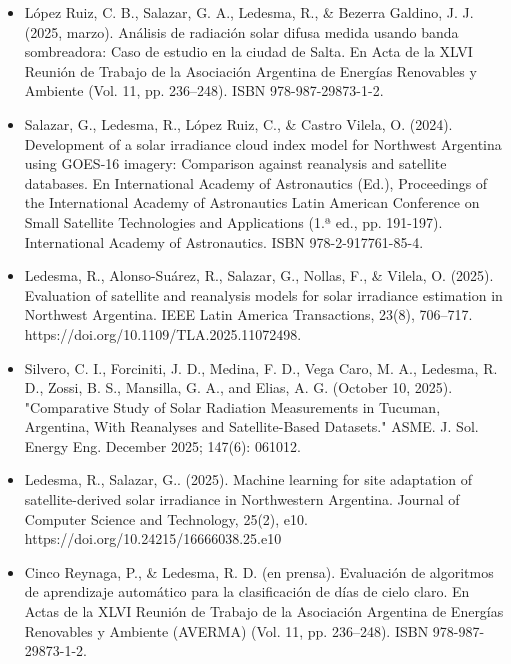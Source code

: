 \documentclass[letterpaper,12pt, twoside]{report}
\providecommand{\DIFdeltex}[1]{{\protect\color{red} \scriptsize #1}} %
\providecommand{\DIFdel}[1]{\texorpdfstring{\DIFdeltex{#1}}{}} %
\begin{document}
\begin{itemize}
\item%
\DIFdel{López Ruiz, C. B., Salazar, G. A., Ledesma, R., \& Bezerra Galdino, J. J. (2025, marzo). Análisis de radiación solar difusa medida usando banda sombreadora: Caso de estudio en la ciudad de Salta. En Acta de la XLVI Reunión de Trabajo de la Asociación Argentina de Energías Renovables y Ambiente (Vol. 11, pp. 236–248). ISBN 978-987-29873-1-2.
}%

\item%
\DIFdel{Salazar, G., Ledesma, R., López Ruiz, C., \& Castro Vilela, O. (2024). Development of a solar irradiance cloud index model for Northwest Argentina using GOES-16 imagery: Comparison against reanalysis and satellite databases. En International Academy of Astronautics (Ed.), Proceedings of the International Academy of Astronautics Latin American Conference on Small Satellite Technologies and Applications (1.ª ed., pp. 191-197). International Academy of Astronautics. ISBN 978-2-917761-85-4.
}%

\item%
\DIFdel{Ledesma, R., Alonso-Suárez, R., Salazar, G., Nollas, F., \& Vilela, O. (2025). Evaluation of satellite and reanalysis models for solar irradiance estimation in Northwest Argentina. IEEE Latin America Transactions, 23(8), 706–717. https://doi.org/10.1109/TLA.2025.11072498.
}%

\item%
\DIFdel{Silvero, C. I., Forciniti, J. D., Medina, F. D., Vega Caro, M. A., Ledesma, R. D., Zossi, B. S., Mansilla, G. A., and Elias, A. G. (October 10, 2025). "Comparative Study of Solar Radiation Measurements in Tucuman, Argentina, With Reanalyses and Satellite-Based Datasets." ASME. J. Sol. Energy Eng. December 2025; 147(6): 061012.
}%

\item%
\DIFdel{Ledesma, R., Salazar, G.. (2025). Machine learning for site adaptation of satellite-derived solar irradiance in Northwestern Argentina. Journal of Computer Science and Technology, 25(2), e10. https://doi.org/10.24215/16666038.25.e10
}%
\item%
\DIFdel{Cinco Reynaga, P., \& Ledesma, R. D. (en prensa). Evaluación de algoritmos de aprendizaje automático para la clasificación de días de cielo claro. En Actas de la XLVI Reunión de Trabajo de la Asociación Argentina de Energías Renovables y Ambiente (AVERMA) (Vol. 11, pp. 236–248). ISBN 978-987-29873-1-2.
}
\end{itemize}%
\end{document}
